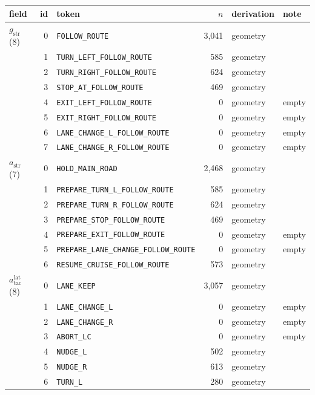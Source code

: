 \begin{center}\footnotesize
\begin{longtable}{@{}p{2.6cm}rp{6.3cm}rp{2.6cm}p{1.2cm}@{}}
\toprule
field & id & token & $n$ & derivation & note \\ \midrule
\endhead
$g_{\text{str}}$ (8) & 0 & \texttt{FOLLOW\_ROUTE} & 3,041 & geometry &  \\
 & 1 & \texttt{TURN\_LEFT\_FOLLOW\_ROUTE} & 585 & geometry &  \\
 & 2 & \texttt{TURN\_RIGHT\_FOLLOW\_ROUTE} & 624 & geometry &  \\
 & 3 & \texttt{STOP\_AT\_FOLLOW\_ROUTE} & 469 & geometry &  \\
 & 4 & \texttt{EXIT\_LEFT\_FOLLOW\_ROUTE} & 0 & geometry & empty \\
 & 5 & \texttt{EXIT\_RIGHT\_FOLLOW\_ROUTE} & 0 & geometry & empty \\
 & 6 & \texttt{LANE\_CHANGE\_L\_FOLLOW\_ROUTE} & 0 & geometry & empty \\
 & 7 & \texttt{LANE\_CHANGE\_R\_FOLLOW\_ROUTE} & 0 & geometry & empty \\
\midrule
$a_{\text{str}}$ (7) & 0 & \texttt{HOLD\_MAIN\_ROAD} & 2,468 & geometry &  \\
 & 1 & \texttt{PREPARE\_TURN\_L\_FOLLOW\_ROUTE} & 585 & geometry &  \\
 & 2 & \texttt{PREPARE\_TURN\_R\_FOLLOW\_ROUTE} & 624 & geometry &  \\
 & 3 & \texttt{PREPARE\_STOP\_FOLLOW\_ROUTE} & 469 & geometry &  \\
 & 4 & \texttt{PREPARE\_EXIT\_FOLLOW\_ROUTE} & 0 & geometry & empty \\
 & 5 & \texttt{PREPARE\_LANE\_CHANGE\_FOLLOW\_ROUTE} & 0 & geometry & empty \\
 & 6 & \texttt{RESUME\_CRUISE\_FOLLOW\_ROUTE} & 573 & geometry &  \\
\midrule
$a_{\text{tac}}^{\text{lat}}$ (8) & 0 & \texttt{LANE\_KEEP} & 3,057 & geometry &  \\
 & 1 & \texttt{LANE\_CHANGE\_L} & 0 & geometry & empty \\
 & 2 & \texttt{LANE\_CHANGE\_R} & 0 & geometry & empty \\
 & 3 & \texttt{ABORT\_LC} & 0 & geometry & empty \\
 & 4 & \texttt{NUDGE\_L} & 502 & geometry &  \\
 & 5 & \texttt{NUDGE\_R} & 613 & geometry &  \\
 & 6 & \texttt{TURN\_L} & 280 & geometry &  \\

\end{longtable}
\end{center}
